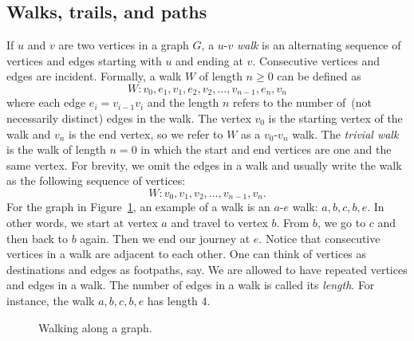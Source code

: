 
\subsection{Walks, trails, and paths}

If $u$ and $v$ are two vertices in a graph $G$, a $u$-$v$ \emph{walk}
is an alternating sequence of vertices and edges starting with $u$ and
ending at $v$. Consecutive vertices and edges are incident. Formally,
a walk $W$ of length $n \geq 0$ can be defined as
\[
W: v_0, e_1, v_1, e_2, v_2, \dots, v_{n-1}, e_n, v_n
\]
where each edge $e_i = v_{i-1} v_i$ and the length $n$ refers to the
number of~(not necessarily distinct) edges in the walk. The vertex
$v_0$ is the starting vertex of the walk and $v_n$ is the end vertex,
so we refer to $W$ as a $v_0$-$v_n$ walk. The \emph{trivial walk} is
the walk of length $n = 0$ in which the start and end vertices are one
and the same vertex. For brevity, we omit the edges in a walk and
usually write the walk as the following sequence of vertices:
\[
W: v_0, v_1, v_2, \dots, v_{n-1}, v_n.
\]
For the graph in Figure~\ref{fig:introduction:types_of_walks}, an
example of a walk is an $a$-$e$ walk: $a, b, c, b, e$. In other words,
we start at vertex $a$ and travel to vertex $b$. From $b$, we go to
$c$ and then back to $b$ again. Then we end our journey at $e$. Notice
that consecutive vertices in a walk are adjacent to each other. One
can think of vertices as destinations and edges as footpaths, say. We
are allowed to have repeated vertices and edges in a walk. The number
of edges in a walk is called its \emph{length}. For instance, the
walk $a, b, c, b, e$ has length $4$.

\begin{figure}[!htbp]
\centering
{}
\caption{Walking along a graph.}
\label{fig:introduction:types_of_walks}
\end{figure}

